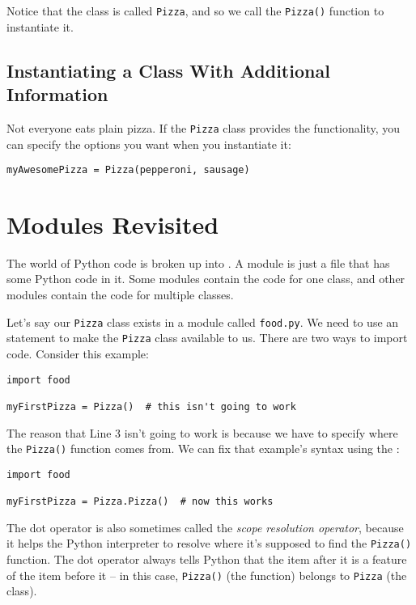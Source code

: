 Notice that the class is called \texttt{Pizza}, and so we call the \texttt{Pizza()} function to instantiate it.

\subsection{Instantiating a Class With Additional Information}

Not everyone eats plain pizza.  If the \texttt{Pizza} class provides the functionality, you can specify the options you want when you instantiate it:

\begin{verbatim}
myAwesomePizza = Pizza(pepperoni, sausage)
\end{verbatim}

\section{Modules Revisited}

The world of Python code is broken up into .  A module is just a file that has some Python code in it.  Some modules contain the code for one class, and other modules contain the code for multiple classes.

Let's say our \texttt{Pizza} class exists in a module called \texttt{food.py}.  We need to use an  statement to make the \texttt{Pizza} class available to us.  There are two ways to import code.  Consider this example:

\begin{verbatim}
import food

myFirstPizza = Pizza()  # this isn't going to work
\end{verbatim}

The reason that Line 3 isn't going to work is because we have to specify where the \texttt{Pizza()} function comes from.  We can fix that example's syntax using the :

\begin{verbatim}
import food

myFirstPizza = Pizza.Pizza()  # now this works
\end{verbatim}

The dot operator is also sometimes called the \textit{scope resolution operator}, because it helps the Python interpreter to resolve where it's supposed to find the \texttt{Pizza()} function.  The dot operator always tells Python that the item after it is a feature of the item before it -- in this case, \texttt{Pizza()} (the function) belongs to \texttt{Pizza} (the class).

